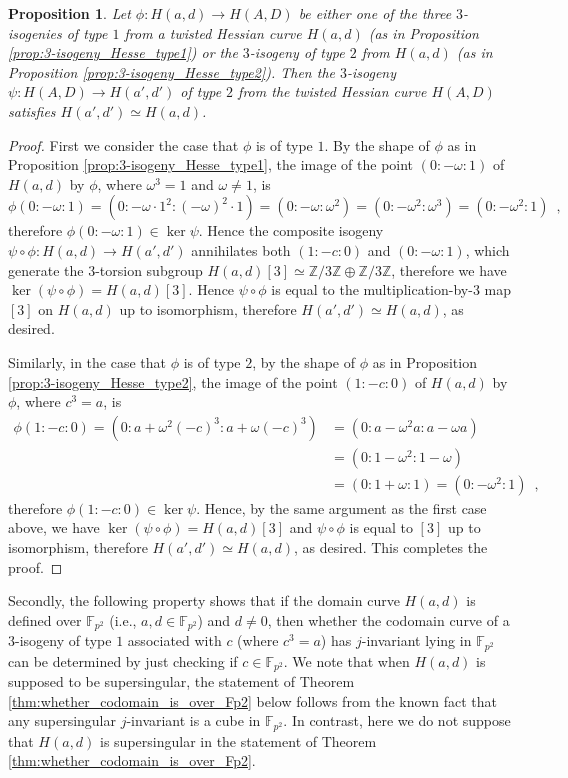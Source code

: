 \documentclass{article}
\newtheorem{proposition}[theorem]{Proposition}
\theoremstyle{definition}
\newcommand{\FF}{\mathbb{F}}
\newcommand{\ZZ}{\mathbb{Z}}
\begin{document}
\begin{proposition}
\label{prop:backtracking}
Let $\phi \colon H(a,d) \to H(A,D)$ be either one of the three $3$-isogenies of type $1$ from a twisted Hessian curve $H(a,d)$ (as in Proposition \ref{prop:3-isogeny_Hesse_type1}) or the $3$-isogeny of type $2$ from $H(a,d)$ (as in Proposition \ref{prop:3-isogeny_Hesse_type2}).
Then the $3$-isogeny $\psi \colon H(A,D) \to H(a',d')$ of type $2$ from the twisted Hessian curve $H(A,D)$ satisfies $H(a',d') \simeq H(a,d)$.
\end{proposition}
\begin{proof}
First we consider the case that $\phi$ is of type $1$.
By the shape of $\phi$ as in Proposition \ref{prop:3-isogeny_Hesse_type1}, the image of the point $(0:-\omega:1)$ of $H(a,d)$ by $\phi$, where $\omega^3 = 1$ and $\omega \neq 1$, is
\[
\phi(0:-\omega:1)
= ( 0 : -\omega \cdot 1^2 : (-\omega)^2 \cdot 1 )
= ( 0 : -\omega : \omega^2 )
= ( 0 : -\omega^2 : \omega^3 )
= ( 0 : -\omega^2 : 1 ) \enspace,
\]
therefore $\phi(0:-\omega:1) \in \ker \psi$.
Hence the composite isogeny $\psi \circ \phi \colon H(a,d) \to H(a',d')$ annihilates both $(1:-c:0)$ and $(0:-\omega:1)$, which generate the $3$-torsion subgroup $H(a,d)[3] \simeq \ZZ/3\ZZ \oplus \ZZ/3\ZZ$, therefore we have $\ker (\psi \circ \phi) = H(a,d)[3]$.
Hence $\psi \circ \phi$ is equal to the multiplication-by-$3$ map $[3]$ on $H(a,d)$ up to isomorphism, therefore $H(a',d') \simeq H(a,d)$, as desired.

Similarly, in the case that $\phi$ is of type $2$, by the shape of $\phi$ as in Proposition \ref{prop:3-isogeny_Hesse_type2}, the image of the point $(1:-c:0)$ of $H(a,d)$ by $\phi$, where $c^3 = a$, is
\[
\begin{split}
\phi(1:-c:0)
= ( 0 : a + \omega^2 (-c)^3 : a + \omega (-c)^3 )
&= ( 0 : a - \omega^2 a : a - \omega a ) \\
&= ( 0 : 1 - \omega^2 : 1 - \omega ) \\
&= ( 0 : 1 + \omega : 1 )
= ( 0 : - \omega^2 : 1 ) \enspace,
\end{split}
\]
therefore $\phi(1:-c:0) \in \ker \psi$.
Hence, by the same argument as the first case above, we have $\ker (\psi \circ \phi) = H(a,d)[3]$ and $\psi \circ \phi$ is equal to $[3]$ up to isomorphism, therefore $H(a',d') \simeq H(a,d)$, as desired.
This completes the proof.
\end{proof}

Secondly, the following property shows that if the domain curve $H(a,d)$ is defined over $\FF_{p^2}$ (i.e., $a,d \in \FF_{p^2}$) and $d \neq 0$, then whether the codomain curve of a $3$-isogeny of type $1$ associated with $c$ (where $c^3 = a$) has $j$-invariant lying in $\FF_{p^2}$ can be determined by just checking if $c \in \FF_{p^2}$.
We note that when $H(a,d)$ is supposed to be supersingular, the statement of Theorem \ref{thm:whether_codomain_is_over_Fp2} below follows from the known fact \cite[Theorem 1.2]{morton2011cubic} that any supersingular $j$-invariant is a cube in $\FF_{p^2}$.
In contrast, here we do not suppose that $H(a,d)$ is supersingular in the statement of Theorem \ref{thm:whether_codomain_is_over_Fp2}.
\end{document}
